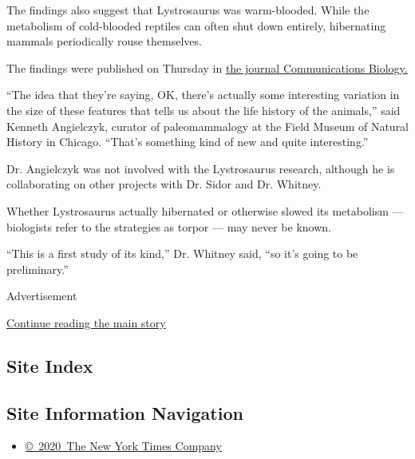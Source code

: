 The findings also suggest that Lystrosaurus was warm-blooded. While the
metabolism of cold-blooded reptiles can often shut down entirely,
hibernating mammals periodically rouse themselves.

The findings were published on Thursday in
\href{https://www.nature.com/articles/s42003-020-01207-6}{the journal
Communications Biology.}

``The idea that they're saying, OK, there's actually some interesting
variation in the size of these features that tells us about the life
history of the animals,'' said Kenneth Angielczyk, curator of
paleomammalogy at the Field Museum of Natural History in Chicago.
``That's something kind of new and quite interesting.''

Dr. Angielczyk was not involved with the Lystrosaurus research, although
he is collaborating on other projects with Dr. Sidor and Dr. Whitney.

Whether Lystrosaurus actually hibernated or otherwise slowed its
metabolism --- biologists refer to the strategies as torpor --- may
never be known.

``This is a first study of its kind,'' Dr. Whitney said, ``so it's going
to be preliminary.''

Advertisement

\protect\hyperlink{after-bottom}{Continue reading the main story}

\hypertarget{site-index}{%
\subsection{Site Index}\label{site-index}}

\hypertarget{site-information-navigation}{%
\subsection{Site Information
Navigation}\label{site-information-navigation}}

\begin{itemize}
\tightlist
\item
  \href{https://help.nytimes3xbfgragh.onion/hc/en-us/articles/115014792127-Copyright-notice}{©~2020~The
  New York Times Company}
\end{itemize}

